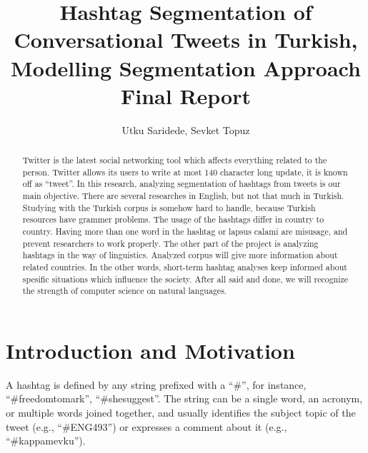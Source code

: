 \documentclass[12pt]{comjnl}
\begin{document}
\title[Hashtag Segmentation of Conversational Tweets in Turkish]{Hashtag Segmentation of Conversational Tweets in Turkish, Modelling Segmentation Approach Final Report}
\author{Utku Saridede, Sevket Topuz}
 




\begin{abstract}	
Twitter is the latest social networking tool which affects everything related to the person.
Twitter allows its users to write at most 140 character long update, it is known off as 
``tweet''. In this research, analyzing segmentation of hashtags from tweets is our main objective. There are
several researches in English, but not that much in Turkish. Studying with the Turkish corpus is
somehow hard to handle, because Turkish resources have grammer problems. The usage of the hashtags
differ in country to country. Having more than one word in the hashtag or lapsus calami 
are misusage, and prevent researchers 
to work properly. The other part of the project is analyzing hashtags in the way of linguistics.
Analyzed corpus will give more information about related countries. In the other words, short-term
hashtag analyses keep informed about spesific situations which influence the society. After all said
and done, we will recognize the strength of computer science on natural languages.
\end{abstract}

\maketitle
\onecolumn
\section{Introduction and Motivation}
A hashtag is defined by any string prefixed with a ``\#'', for instance, “\#freedomtomark”,
“\#shesuggest”. The string can be a single word, an acronym, or multiple words joined
together, and usually identifies the subject topic of the tweet (e.g., “\#ENG493”)
or expresses a comment about it (e.g., “\#kappamevku”).
\end{document}
